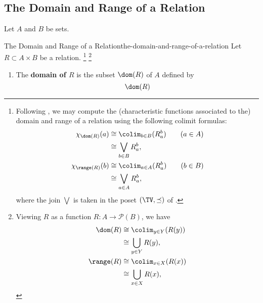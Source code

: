 \subsection{The Domain and Range of a Relation}\label{subsection-the-domain-and-range-of-a-relation}
Let $A$ and $B$ be sets.
\begin{definition}{The Domain and Range of a Relation}{the-domain-and-range-of-a-relation}%
    Let $R\subset A\times B$ be a relation.%
    \footnote{%
        Following , we may compute the (characteristic functions associated to the) domain and range of a relation using the following colimit formulas:
        \begin{align*}
            \chi_{\dom(R)}(a)   &\cong \colim_{b\in B}(R^{b}_{a})\qquad(a\in A)\\
                                &\cong \bigvee_{b\in B}R^{b}_{a},\\
            \chi_{\range(R)}(b) &\cong \colim_{a\in A}(R^{b}_{a})\qquad(b\in B)\\
                                &\cong \bigvee_{a\in A}R^{b}_{a},
        \end{align*}
        where the join $\bigvee$ is taken in the poset $(\TV,\preceq)$ of .
    }%
    \footnote{%
        Viewing $R$ as a function $R\colon A\to\mathcal{P}(B)$, we have
        \begin{align*}
            \dom(R)   &\cong \colim_{y\in Y}(R(y))\\
                      &\cong \bigcup_{y\in Y}R(y),\\
            \range(R) &\cong \colim_{x\in X}(R(x))\\
                      &\cong \bigcup_{x\in X}R(x),
        \end{align*}
        \par\vspace*{-1.75\baselineskip}
    }%
    \begin{enumerate}
        \item\label{the-domain-of-a-relation}The \textbf{domain of $R$} is the subset $\dom(R)$ of $A$ defined by
            \[
                \dom(R)%
\]
\end{enumerate}
\end{definition}

